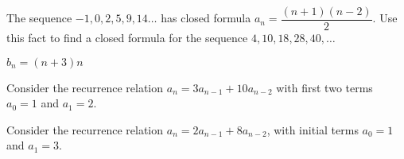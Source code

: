 \begin{squestions}
\question The sequence $-1, 0, 2, 5, 9, 14\ldots$ has closed formula $a_n = \dfrac{(n+1)(n-2)}{2}$.  Use this fact to find a closed formula for the sequence $4, 10, 18, 28, 40, \ldots$ 

	\begin{answer}
		 $b_n = (n+3)n$
	\end{answer}





\question Consider the recurrence relation $a_n = 3a_{n-1} + 10 a_{n-2}$ with first two terms $a_0 = 1$ and $a_1 = 2$.

	\begin{answer}
	\end{answer}





\question Consider the recurrence relation $a_n = 2a_{n-1} + 8a_{n-2}$, with initial terms $a_0 = 1$ and $a_1= 3$.
\end{squestions}
